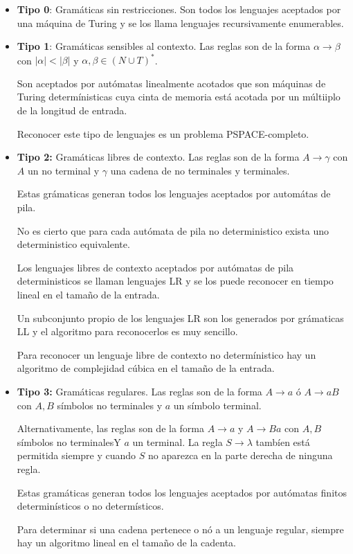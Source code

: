 \begin{itemize}
  \item \textbf{Tipo 0}: Gramáticas sin restricciones. Son todos los lenguajes aceptados por una máquina de Turing y se los llama lenguajes recursivamente enumerables.
  \item \textbf{Tipo 1}: Gramáticas sensibles al contexto. Las reglas son de la forma \(\alpha\to\beta\) con \(|\alpha|<|\beta|\) y \(\alpha,\beta\in(N\cup T)^*\).

        Son aceptados por autómatas linealmente acotados que son máquinas de Turing determínisticas cuya cinta  de memoria está acotada por un múltiiplo de la longitud de entrada.

        Reconocer este tipo de lenguajes es un problema PSPACE-completo.

  \item \textbf{Tipo 2:} Gramáticas libres de contexto. Las reglas son de la forma \(A\to\gamma\) con \(A\) un no terminal y \(\gamma\) una cadena de no terminales y terminales.

        Estas grámaticas generan todos los lenguajes aceptados por automátas de pila.

        No es cierto que para cada autómata de pila no deterministico exista uno deterministico equivalente.

        Los lenguajes libres de contexto aceptados por autómatas de pila deterministicos se llaman lenguajes LR y se los puede reconocer en tiempo lineal en el tamaño de la entrada.

        Un subconjunto propio de los lenguajes LR son los generados por grámaticas LL y el algoritmo para reconocerlos es muy sencillo.

        Para reconocer un lenguaje libre de contexto no determínistico hay un algoritmo de complejidad cúbica en el tamaño de la entrada.

  \item \textbf{Tipo 3:} Gramáticas regulares. Las reglas son de la forma \(A\to a\) ó \(A\to aB\) con \(A, B\) símbolos no terminales y \(a\) un símbolo terminal.

        Alternativamente, las reglas son de la forma \(A\to a\) y \(A\to Ba\) con \(A, B\) símbolos no terminalesY \(a\) un terminal. La regla \(S\to\lambda\) tambíen está permitida siempre y cuando \(S\) no aparezca en la parte derecha de ninguna regla.

        Estas gramáticas generan todos los lenguajes aceptados por autómatas finitos determinísticos o no determísticos.

        Para determinar si una cadena pertenece o nó a un lenguaje regular, siempre hay un algoritmo lineal en el tamaño de la cadenta.
\end{itemize}

